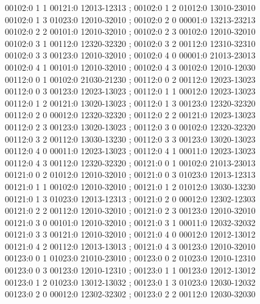 \documentclass[11pt]{article}
\theoremstyle{remark}
\numberwithin{equation}{section}
\begin{document}
\begin{flushleft}
00102:0 1 1 00121:0 12013-12313 ; 00102:0 1 2 01012:0 13010-23010\\
00102:0 1 3 01023:0 12010-32010 ; 00102:0 2 0 00001:0 13213-23213\\
00102:0 2 2 00101:0 12010-32010 ; 00102:0 2 3 00102:0 12010-32010\\
00102:0 3 1 00112:0 12320-32320 ; 00102:0 3 2 00112:0 12310-32310\\
00102:0 3 3 00123:0 12010-32010 ; 00102:0 4 0 00001:0 21013-23013\\
00102:0 4 1 00101:0 12010-32010 ; 00102:0 4 3 00102:0 12010-12030\\
00112:0 0 1 00102:0 21030-21230 ; 00112:0 0 2 00112:0 12023-13023\\
00112:0 0 3 00123:0 12023-13023 ; 00112:0 1 1 00012:0 12023-13023\\
00112:0 1 2 00121:0 13020-13023 ; 00112:0 1 3 00123:0 12320-32320\\
00112:0 2 0 00012:0 12320-32320 ; 00112:0 2 2 00121:0 12023-13023\\
00112:0 2 3 00123:0 13020-13023 ; 00112:0 3 0 00102:0 12320-32320\\
00112:0 3 2 00112:0 13030-13230 ; 00112:0 3 3 00123:0 13020-13023\\
00112:0 4 0 00011:0 12023-13023 ; 00112:0 4 1 00011:0 12023-13023\\
00112:0 4 3 00112:0 12320-32320 ; 00121:0 0 1 00102:0 21013-23013\\
00121:0 0 2 01012:0 12010-32010 ; 00121:0 0 3 01023:0 12013-12313\\
00121:0 1 1 00102:0 12010-32010 ; 00121:0 1 2 01012:0 13030-13230\\
00121:0 1 3 01023:0 12013-12313 ; 00121:0 2 0 00012:0 12302-12303\\
00121:0 2 2 00112:0 12010-32010 ; 00121:0 2 3 00123:0 12010-32010\\
00121:0 3 0 00101:0 12010-32010 ; 00121:0 3 1 00011:0 12032-32032\\
00121:0 3 3 00121:0 12010-32010 ; 00121:0 4 0 00012:0 12012-13012\\
00121:0 4 2 00112:0 12013-13013 ; 00121:0 4 3 00123:0 12010-32010\\
00123:0 0 1 01023:0 21010-23010 ; 00123:0 0 2 01023:0 12010-12310\\
00123:0 0 3 00123:0 12010-12310 ; 00123:0 1 1 00123:0 12012-13012\\
00123:0 1 2 01023:0 13012-13032 ; 00123:0 1 3 01023:0 12030-12032\\
00123:0 2 0 00012:0 12302-32302 ; 00123:0 2 2 00112:0 12030-32030\\

\end{flushleft}
\end{document}
